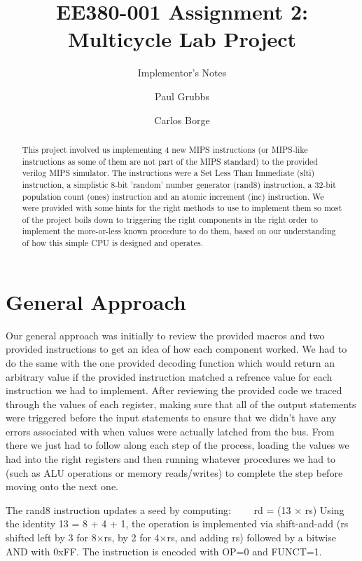 \documentclass[acmtog]{acmart}
\begin{document}

\title{EE380-001 Assignment 2: Multicycle Lab Project}
\subtitle{Implementor's Notes}

\author{Paul Grubbs}
\author{Carlos Borge}
\author{}

\begin{abstract}
  This project involved us implementing 4 new MIPS instructions (or MIPS-like instructions as some of them are not part of the MIPS standard)
  to the provided verilog MIPS simulator. The instructions were a Set Less Than Immediate (slti) instruction, a simplistic 8-bit 'random' number generator
  (rand8) instruction, a 32-bit population count (ones) instruction and an atomic increment (inc) instruction. We were provided with some hints for 
  the right methods to use to implement them so most of the project boils down to triggering the right components in the right order to 
  implement the more-or-less known procedure to do them, based on our understanding of how this simple CPU is designed and operates.
\end{abstract}

\maketitle

\section{General Approach}
Our general approach was initially to review the provided macros and two provided instructions to get an idea of how each component worked. We had to 
do the same with the one provided decoding function which would return an arbitrary value if the provided instruction matched a refrence value for 
each instruction we had to implement. After reviewing the provided code we traced through the values of each register, making sure that all of the 
output statements were triggered before the input statements to ensure that we didn't have any errors associated with when values were actually latched 
from the bus. From there we just had to follow along each step of the process, loading the values we had into the right registers and then running whatever
procedures we had to (such as ALU operations or memory reads/writes) to complete the step before moving onto the next one.

The rand8 instruction updates a seed by computing:
  rd = (13 × rs) %
Using the identity 13 = 8 + 4 + 1, the operation is implemented via shift-and-add (rs shifted left by 3 for 8×rs, by 2 for 4×rs, and adding rs) followed by a bitwise AND with 0xFF. The instruction is encoded with OP=0 and FUNCT=1.
\end{document}
